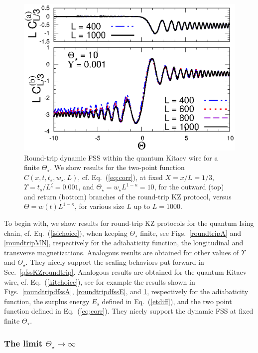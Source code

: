\begin{figure}[!htb]
\centering
  \includegraphics[width=0.65\columnwidth]{imm/headKITY0001Th10C.eps}
  \caption{ Round-trip dynamic FSS within the quantum Kitaev wire for
    a finite $\Theta_\star$.  We show results for the two-point
    function $C(x,t,t_s,w_\star,L)$, cf. Eq.~(\ref{eq:corr}), at fixed
  $X=x/L=1/3$, $\Upsilon =t_s/L^\zeta = 0.001$, and $\Theta_\star =
  w_\star L^{1-\kappa}=10$, for the outward (top) and return (bottom)
  branches of the round-trip KZ protocol, versus
  $\Theta=w(t)L^{1-\kappa}$, for various size $L$ up to $L=1000$.
  }
  \label{roundtripdfssC}
\end{figure}




To begin with, we show results for round-trip KZ protocols for the
quantum Ising chain, cf. Eq.~(\ref{isichoice}), when keeping
$\Theta_\star$ finite, see Figs.~\ref{roundtripA}
and \ref{roundtripMN}, respectively for the adiabaticity function, the
longitudinal and transverse magnetizations.  Analogous results are
obtained for other values of $\Upsilon$ and $\Theta_\star$. They
nicely support the scaling behaviors put forward in
Sec.~\ref{qfssKZroundtrip}.  Analogous results are obtained for the
quantum Kitaev wire, cf. Eq.~(\ref{kitchoice}), see for example the
results shown in Figs.~\ref{roundtripdfssA}, \ref{roundtripdfssE}, and
\ref{roundtripdfssC}, respectively for the adiabaticity function, the
surplus energy $E_s$ defined in Eq.~(\ref{etdiff}), and the two point
function defined in Eq.~(\ref{eq:corr}). They nicely support the
dynamic FSS at fixed finite $\Theta_\star$.



\subsubsection{The limit $\Theta_\star\to\infty$}
  \label{scafinthetastarinf}

